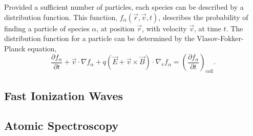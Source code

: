 Provided a sufficient number of particles, each species can be described by a
distribution function. This function, $f_\alpha(\vec{r}, \vec{v}, t)$, describes the
probability of finding a particle of species $\alpha$, at position $\vec{r}$,
with velocity $\vec{v}$, at time $t$. The distribution function for a particle
can be determined by the Vlasov-Fokker-Planck equation,
\begin{equation}
  \frac{\partial f_\alpha}{\partial t} + \vec{v}\cdot\nabla f_\alpha +
  q \left(\vec{E} + \vec{v}\times\vec{B}\right) \cdot \nabla_\mathrm{v} f_\alpha =
  \left( \frac{\partial f_\alpha}{\partial t}\right)_\mathrm{coll}.
\end{equation}

\subsection{Fast Ionization Waves}

\subsection{Atomic Spectroscopy}


